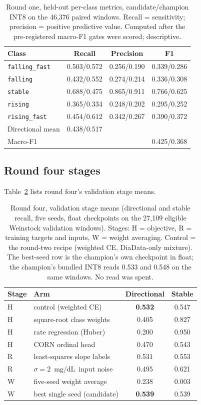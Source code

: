 \documentclass[10pt,twocolumn]{article}
\newcommand{\mgdl}{\ensuremath{\mathrm{mg/dL}}}
\begin{document}
\begin{table}[!tp]
\centering
\caption{Round one, held-out per-class metrics, candidate/champion INT8
on the 46,376 paired windows. Recall = sensitivity; precision =
positive predictive value. Computed after the pre-registered macro-F1
gates were scored; descriptive.}
\label{tab:sweeprecall}
\footnotesize
\begin{tabular}{@{}lccc@{}}
\toprule
Class & Recall & Precision & F1 \\
\midrule
\texttt{falling\_fast} & 0.503/0.572 & 0.256/0.190 & 0.339/0.286 \\
\texttt{falling}       & 0.432/0.552 & 0.274/0.214 & 0.336/0.308 \\
\texttt{stable}        & 0.688/0.475 & 0.865/0.911 & 0.766/0.625 \\
\texttt{rising}        & 0.365/0.334 & 0.248/0.202 & 0.295/0.252 \\
\texttt{rising\_fast}  & 0.454/0.612 & 0.342/0.267 & 0.390/0.372 \\
\midrule
Directional mean & 0.438/0.517 & & \\
Macro-F1 & & & 0.425/0.368 \\
\bottomrule
\end{tabular}
\end{table}

\subsection{Round four stages}

Table~\ref{tab:sweepfour} lists round four's validation stage means.

\begin{table}[!tp]
\centering
\caption{Round four, validation stage means (directional and stable
recall, five seeds, float checkpoints on the 27,109 eligible Weinstock
validation windows). Stages: H = objective, R = training targets and
inputs, W = weight averaging. Control = the round-two recipe (weighted
CE, DiaData-only mixture). The best-seed row is the champion's own
checkpoint in float; the champion's bundled INT8 reads 0.533 and 0.548 on
the same windows. No read was spent.}
\label{tab:sweepfour}
\footnotesize
\begin{tabular}{@{}llcc@{}}
\toprule
Stage & Arm & Directional & Stable \\
\midrule
H & control (weighted CE) & \textbf{0.532} & 0.547 \\
H & square-root class weights & 0.405 & 0.827 \\
H & rate regression (Huber) & 0.200 & 0.950 \\
H & CORN ordinal head & 0.470 & 0.543 \\
R & least-squares slope labels & 0.531 & 0.553 \\
R & $\sigma{=}2$~\mgdl\ input noise & 0.495 & 0.621 \\
W & five-seed weight average & 0.238 & 0.003 \\
W & best single seed (candidate) & \textbf{0.539} & 0.539 \\
\bottomrule
\end{tabular}
\end{table}
\end{document}
